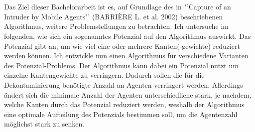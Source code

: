 \\
\\
Das Ziel dieser Bachelorarbeit ist es, auf Grundlage des in "'Capture of an Intruder by Mobile Agents"' (BARRIÈRE L. et al. 2002) beschriebenen Algorithmus, weitere Problemstellungen zu betrachten. Ich untersuche im folgenden, wie sich ein sogenanntes Potenzial auf den Algorithmus auswirkt. Das Potenzial gibt an, um wie viel eine oder mehrere Kanten(-gewichte) reduziert werden können. Ich entwickle nun einen Algorithmus für verschiedene Varianten des Potenzial-Problems. Der Algorithmus kann dabei ein Potenzial nutzt um einzelne Kantengewichte zu verringern. Dadurch sollen die für die Dekontaminierung benötigte Anzahl an Agenten verringert werden. Allerdings ändert sich die minimale Anzahl der Agenten unterschiedliche stark, je nachdem, welche Kanten durch das Potenzial reduziert werden, weshalb der Algorithmus eine optimale Aufteilung des Potenzials bestimmen soll, um die Agentenzahl möglichst stark zu senken.
\\

